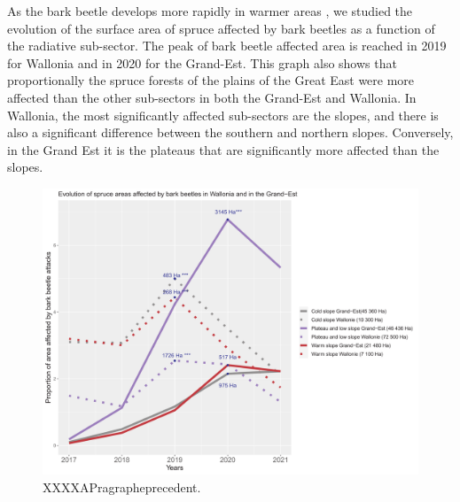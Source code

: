 \documentclass[3p,times]{elsarticle}
\begin{document}
 


 As the bark beetle develops more rapidly in warmer areas \citep{annila_influence_1969}, we studied the evolution of the surface area of spruce affected by bark beetles as a function of the radiative sub-sector.
The peak of bark beetle affected area is reached in 2019 for Wallonia and in 2020 for the Grand-Est.
This graph also shows that proportionally the spruce forests of the plains of the Great East were more affected than the other sub-sectors in both the Grand-Est and Wallonia. In Wallonia, the most significantly affected sub-sectors are the slopes, and there is also a significant difference between the southern and northern slopes. 
 Conversely, in the Grand Est it is the plateaus that are significantly more affected than the slopes.
\begin{figure}
\centering
	\includegraphics[width=\textwidth]{evol_ss_GDE_wall.png}
     \caption{XXXXAPragrapheprecedent.}
	\label{ss_sco}
\end{figure}

	
\end{document}
